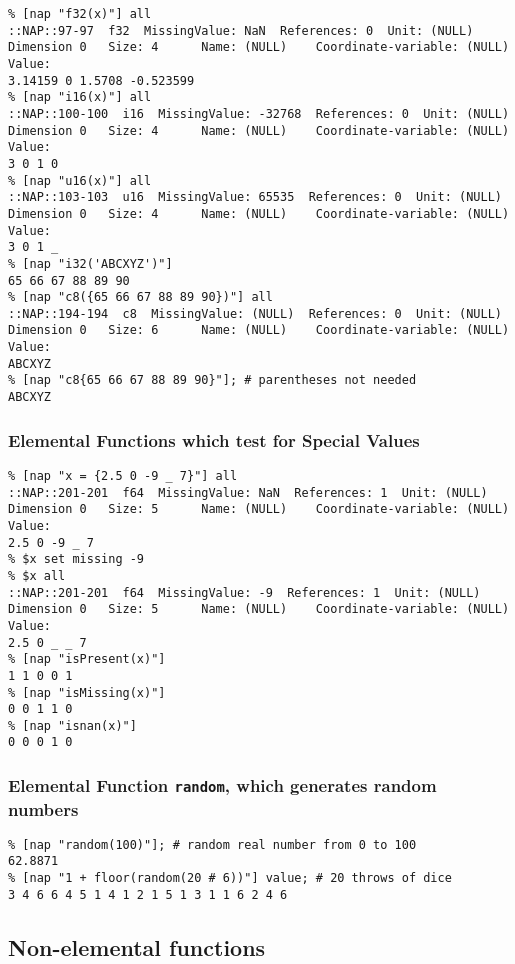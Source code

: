   \begin{verbatim}
% [nap "f32(x)"] all
::NAP::97-97  f32  MissingValue: NaN  References: 0  Unit: (NULL)
Dimension 0   Size: 4      Name: (NULL)    Coordinate-variable: (NULL)
Value:
3.14159 0 1.5708 -0.523599
% [nap "i16(x)"] all
::NAP::100-100  i16  MissingValue: -32768  References: 0  Unit: (NULL)
Dimension 0   Size: 4      Name: (NULL)    Coordinate-variable: (NULL)
Value:
3 0 1 0
% [nap "u16(x)"] all
::NAP::103-103  u16  MissingValue: 65535  References: 0  Unit: (NULL)
Dimension 0   Size: 4      Name: (NULL)    Coordinate-variable: (NULL)
Value:
3 0 1 _
% [nap "i32('ABCXYZ')"]
65 66 67 88 89 90
% [nap "c8({65 66 67 88 89 90})"] all
::NAP::194-194  c8  MissingValue: (NULL)  References: 0  Unit: (NULL)
Dimension 0   Size: 6      Name: (NULL)    Coordinate-variable: (NULL)
Value:
ABCXYZ
% [nap "c8{65 66 67 88 89 90}"]; # parentheses not needed
ABCXYZ
\end{verbatim}

\subsubsection{Elemental Functions which test for Special Values}

  \begin{verbatim}
% [nap "x = {2.5 0 -9 _ 7}"] all
::NAP::201-201  f64  MissingValue: NaN  References: 1  Unit: (NULL)
Dimension 0   Size: 5      Name: (NULL)    Coordinate-variable: (NULL)
Value:
2.5 0 -9 _ 7
% $x set missing -9
% $x all
::NAP::201-201  f64  MissingValue: -9  References: 1  Unit: (NULL)
Dimension 0   Size: 5      Name: (NULL)    Coordinate-variable: (NULL)
Value:
2.5 0 _ _ 7
% [nap "isPresent(x)"]
1 1 0 0 1
% [nap "isMissing(x)"]
0 0 1 1 0
% [nap "isnan(x)"]
0 0 0 1 0
\end{verbatim}

\subsubsection{Elemental Function \texttt{random}, which generates random numbers}

  \begin{verbatim}
% [nap "random(100)"]; # random real number from 0 to 100
62.8871
% [nap "1 + floor(random(20 # 6))"] value; # 20 throws of dice
3 4 6 6 4 5 1 4 1 2 1 5 1 3 1 1 6 2 4 6
\end{verbatim}

\subsection{Non-elemental functions}

